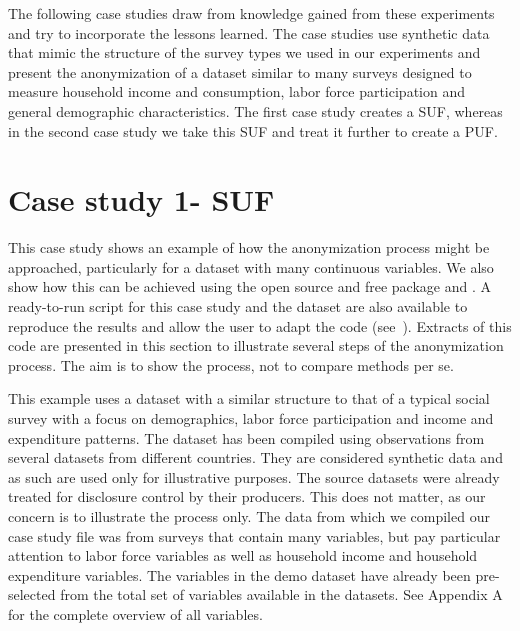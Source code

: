 \documentclass[letterpaper,10pt,english]{sphinxmanual}
\begin{document}
The following case studies draw from knowledge gained from these
experiments and try to incorporate the lessons learned. The case studies
use synthetic data that mimic the structure of the survey types we used
in our experiments and present the anonymization of a dataset similar to
many surveys designed to measure household income and consumption, labor
force participation and general demographic characteristics. The first
case study creates a SUF, whereas in the second case study we take this
SUF and treat it further to create a PUF.


\section{Case study 1- SUF}
\label{\detokenize{case_studies:case-study-1-suf}}
This case study shows an example of how the anonymization process might
be approached, particularly for a dataset with many continuous
variables. We also show how this can be achieved using the open source
and free  package and . A ready-to-run  script for this
case study and the dataset are also available to reproduce the results
and allow the user to adapt the code
(see ). Extracts of this code
are presented in this section to illustrate several steps of the
anonymization process.  The aim is to show the
process, not to compare methods per se.

This example uses a dataset with a similar structure to that of a
typical social survey with a focus on demographics, labor force
participation and income and expenditure patterns. The dataset has been
compiled using observations from several datasets from different
countries. They are considered synthetic data and as such are used only
for illustrative purposes. The source datasets were already treated for
disclosure control by their producers. This does not matter, as our
concern is to illustrate the process only. The data from which we
compiled our case study file was from surveys that contain many
variables, but pay particular attention to labor force variables as well
as household income and household expenditure variables. The variables
in the demo dataset have already been pre-selected from the total set of
variables available in the datasets. See Appendix A for the complete
overview of all variables.
\end{document}
